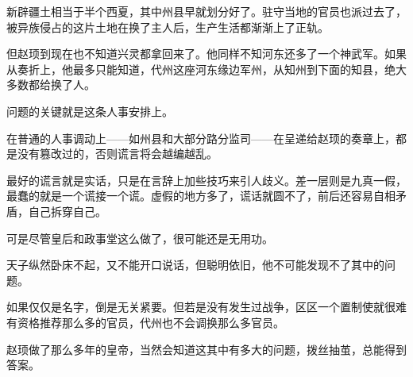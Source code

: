 新辟疆土相当于半个西夏，其中州县早就划分好了。驻守当地的官员也派过去了，被异族侵占的这片土地在换了主人后，生产生活都渐渐上了正轨。

但赵顼到现在也不知道兴灵都拿回来了。他同样不知河东还多了一个神武军。如果从奏折上，他最多只能知道，代州这座河东缘边军州，从知州到下面的知县，绝大多数都给换了人。

问题的关键就是这条人事安排上。

在普通的人事调动上——如州县和大部分路分监司——在呈递给赵顼的奏章上，都是没有篡改过的，否则谎言将会越编越乱。

最好的谎言就是实话，只是在言辞上加些技巧来引人歧义。差一层则是九真一假，最蠢的就是一个谎接一个谎。虚假的地方多了，谎话就圆不了，前后还容易自相矛盾，自己拆穿自己。

可是尽管皇后和政事堂这么做了，很可能还是无用功。

天子纵然卧床不起，又不能开口说话，但聪明依旧，他不可能发现不了其中的问题。

如果仅仅是名字，倒是无关紧要。但若是没有发生过战争，区区一个置制使就很难有资格推荐那么多的官员，代州也不会调换那么多官员。

赵顼做了那么多年的皇帝，当然会知道这其中有多大的问题，拨丝抽茧，总能得到答案。

